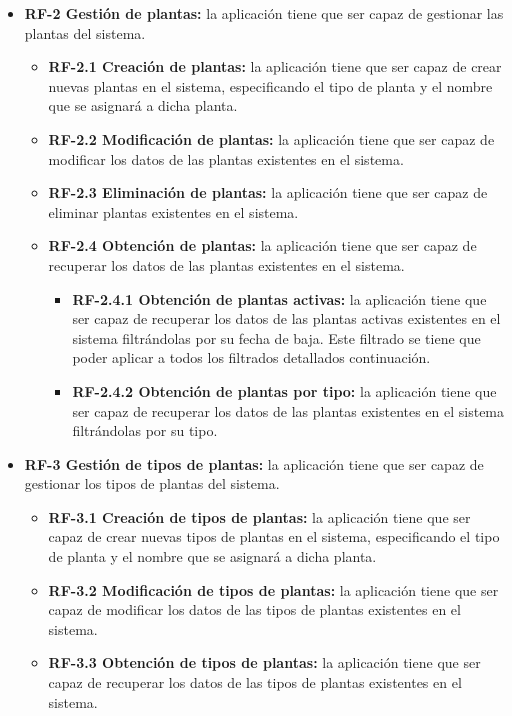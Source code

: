 \begin{itemize}
        \item \textbf{RF-2 Gestión de plantas:} la aplicación tiene que ser capaz de gestionar las plantas del sistema.
            \begin{itemize}
                \item \textbf{RF-2.1 Creación de plantas:} la aplicación tiene que ser capaz de crear nuevas plantas en el sistema, especificando el tipo de planta y el nombre que se asignará a dicha planta.
                \item \textbf{RF-2.2 Modificación de plantas:} la aplicación tiene que ser capaz de modificar los datos de las plantas existentes en el sistema.
                \item \textbf{RF-2.3 Eliminación de plantas:} la aplicación tiene que ser capaz de eliminar plantas existentes en el sistema.
                \item \textbf{RF-2.4 Obtención de plantas:} la aplicación tiene que ser capaz de recuperar los datos de las plantas existentes en el sistema.
                \begin{itemize}
                    \item \textbf{RF-2.4.1 Obtención de plantas activas:} la aplicación tiene que ser capaz de recuperar los datos de las plantas activas existentes en el sistema filtrándolas por su fecha de baja. Este filtrado se tiene que poder aplicar a todos los filtrados detallados continuación. 
                    \item \textbf{RF-2.4.2 Obtención de plantas por tipo:} la aplicación tiene que ser capaz de recuperar los datos de las plantas existentes en el sistema filtrándolas por su tipo.
                \end{itemize}
            \end{itemize}
            
        \item \textbf{RF-3 Gestión de tipos de plantas:} la aplicación tiene que ser capaz de gestionar los tipos de plantas del sistema.
            \begin{itemize}
                \item \textbf{RF-3.1 Creación de tipos de plantas:} la aplicación tiene que ser capaz de crear nuevas tipos de plantas en el sistema, especificando el tipo de planta y el nombre que se asignará a dicha planta.
                \item \textbf{RF-3.2 Modificación de tipos de plantas:} la aplicación tiene que ser capaz de modificar los datos de las tipos de plantas existentes en el sistema.
                \item \textbf{RF-3.3 Obtención de tipos de plantas:} la aplicación tiene que ser capaz de recuperar los datos de las tipos de plantas existentes en el sistema.
            \end{itemize}
            

\end{itemize}

